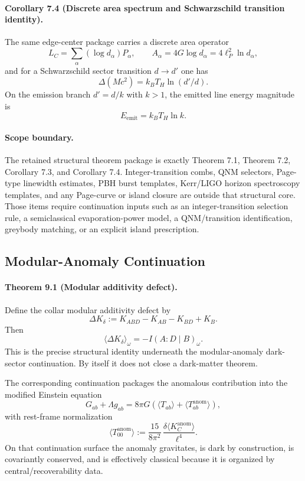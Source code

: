 \paragraph{\textbf{Corollary 7.4 (Discrete area spectrum and Schwarzschild transition identity).}}
The same edge-center package carries a discrete area operator
\[
L_C=\sum_\alpha (\log d_\alpha)P_\alpha,
\qquad
A_\alpha=4G\log d_\alpha=4\ell_P^2\ln d_\alpha,
\]
and for a Schwarzschild sector transition \(d\to d'\) one has
\[
\Delta(Mc^2)=k_B T_H\ln(d'/d).
\]
On the emission branch \(d'=d/k\) with \(k>1\), the emitted line energy magnitude is
\[
E_{\mathrm{emit}}=k_B T_H\ln k.
\]

\paragraph{\textbf{Scope boundary.}}
The retained structural theorem package is exactly Theorem 7.1, Theorem 7.2, Corollary 7.3, and
Corollary 7.4. Integer-transition combs, QNM selectors, Page-type linewidth estimates, PBH burst
templates, Kerr/LIGO horizon spectroscopy templates, and any Page-curve or island closure are
outside that structural core. Those items require continuation inputs such as an integer-transition
selection rule, a semiclassical evaporation-power model, a QNM/transition identification, greybody
matching, or an explicit island prescription.

\subsection{Modular-Anomaly Continuation}

\paragraph{\textbf{Theorem 9.1 (Modular additivity defect).}}
Define the collar modular additivity defect by
\[
\Delta K_\delta:=K_{ABD}-K_{AB}-K_{BD}+K_B.
\]
Then
\[
\langle \Delta K_\delta\rangle_\omega=-I(A:D\mid B)_\omega.
\]
This is the precise structural identity underneath the modular-anomaly dark-sector continuation. By itself it does not close a dark-matter theorem.

The corresponding continuation packages the anomalous contribution into the modified Einstein
equation
\[
G_{ab}+\Lambda g_{ab}
=
8\pi G\left(\langle T_{ab}\rangle+\langle T_{ab}^{\mathrm{anom}}\rangle\right),
\]
with rest-frame normalization
\[
\langle T_{00}^{\mathrm{anom}}\rangle
:=
\frac{15}{8\pi^2}\,
\frac{\delta\langle K_C^{\mathrm{anom}}\rangle}{\ell^4}.
\]
On that continuation surface the anomaly gravitates, is dark by construction, is covariantly
conserved, and is effectively classical because it is organized by central/recoverability data.

